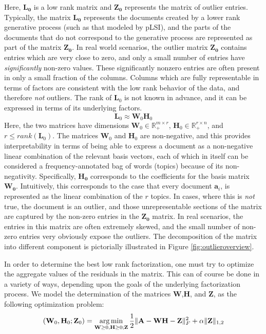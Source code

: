 Here, $\mathbf{L_0}$ is  a low rank matrix and $\mathbf{Z_0}$
represents the matrix of  outlier entries. Typically, the matrix
$\mathbf{L_0}$ represents the documents created by a lower rank
generative process (such as that modeled by pLSI), and the parts of
the documents that do not correspond to the generative process are
represented as part of the matrix $\mathbf{Z_0}$.   In real world
scenarios, the outlier matrix $\mathbf{Z_0}$  contains  entries
which are very close to zero, and  only a small number of entries
have {\em significantly} non-zero values. These significantly
nonzero entries are often present in only a small fraction of the
columns. Columns which are fully representable in terms of factors
are consistent with the low rank behavior of the data, and therefore
{\em not} outliers. The rank of $\mathbf{L}_0$ is not known in
advance, and it can be expressed in terms of its underlying factors.
$$
\mathbf{L}_0 \approx \mathbf{W}_0\mathbf{H}_0
$$
Here, the two matrices   have dimensions $\mathbf{W}_0 \in
\mathbb{R}^{m \times r}_+$, $\mathbf{H}_0 \in \mathbb{R}^{r \times
n}_+$, and $r \le rank(\mathbf{L}_0)$. The matrices $\mathbf{W}_0$
and  $\mathbf{H}_0$ are non-negative, and this provides
interpretability in terms of being able to express a document as a
non-negative linear combination of the relevant basis vectors, each
of which in itself can be considered a frequency-annotated bag of
words (topics) because of its non-negativity.  Specifically,
$\mathbf{H_0}$ corresponds to the coefficients for the basis matrix
$\mathbf{W_0}$. Intuitively, this corresponds to the case that every
document
 $\mathbf{a}_i$, is represented as the linear combination of
the $r$ topics. In cases, where this is {\em not} true, the document
is an outlier, and those  unrepresentable sections of the matrix are
captured by the non-zero entries in the   $\mathbf{Z_0}$ matrix. In
real scenarios,  the entries in  this matrix are often  extremely
skewed, and the small number of non-zero entries very obviously
expose the outliers.  The decomposition of the matrix into different
component is pictorially illustrated  in Figure
\ref{fig:outlieroverview}.

In order to determine the best low rank factorization, one must try
to optimize the  aggregate  values of the residuals in  the matrix.
This can of course be done in a variety of ways, depending upon the
goals of the underlying factorization process.  We model the
determination of the matrices $\mathbf{W}$,$\mathbf{H}$, and
$\mathbf{Z}$, as the following optimization problem:
\begin{equation}\label{l12norm}
(\mathbf{W}_0,\mathbf{H}_0;\mathbf{Z}_0)=\mathop{\rm arg\,min}_{\mathbf{W}\ge0,\mathbf{H}\ge0; \mathbf{Z}}  \frac{1}{2}\|\mathbf{A}-\mathbf{W}\mathbf{H}-\mathbf{Z}\|_F^2 + \alpha\|\mathbf{Z}\|_{1,2}
\end{equation}

